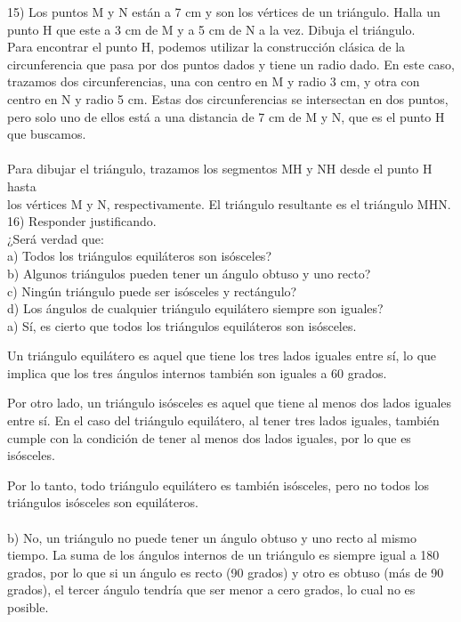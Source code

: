 \documentclass{article}
\begin{document}
15) Los puntos M y N están a 7 cm y son los vértices de un triángulo. Halla un punto H que este a 3 cm de M y a 5 cm de N a la vez. Dibuja el triángulo. \\
Para encontrar el punto H, podemos utilizar la construcción clásica de la circunferencia que pasa por dos puntos dados y tiene un radio dado. En este caso, trazamos dos circunferencias, una con centro en M y radio 3 cm, y otra con centro en N y radio 5 cm. Estas dos circunferencias se intersectan en dos puntos, pero solo uno de ellos está a una distancia de 7 cm de M y N, que es el punto H que buscamos.\\
\\
Para dibujar el triángulo, trazamos los segmentos MH y NH desde el punto H hasta\\
los vértices M y N, respectivamente. El triángulo resultante es el triángulo MHN.\\

16) Responder justificando.\\
¿Será verdad que:\\
a) Todos los triángulos equiláteros son isósceles?\\
b) Algunos triángulos pueden tener un ángulo obtuso y uno recto?\\
c) Ningún triángulo puede ser isósceles y rectángulo?\\
d) Los ángulos de cualquier triángulo equilátero siempre son iguales?\\

a) Sí, es cierto que todos los triángulos equiláteros son isósceles.

Un triángulo equilátero es aquel que tiene los tres lados iguales entre sí, lo que implica que los tres ángulos internos también son iguales a 60 grados.

Por otro lado, un triángulo isósceles es aquel que tiene al menos dos lados iguales entre sí. En el caso del triángulo equilátero, al tener tres lados iguales, también cumple con la condición de tener al menos dos lados iguales, por lo que es isósceles.

Por lo tanto, todo triángulo equilátero es también isósceles, pero no todos los triángulos isósceles son equiláteros.\\
\\
b) No, un triángulo no puede tener un ángulo obtuso y uno recto al mismo tiempo. La suma de los ángulos internos de un triángulo es siempre igual a 180 grados, por lo que si un ángulo es recto (90 grados) y otro es obtuso (más de 90 grados), el tercer ángulo tendría que ser menor a cero grados, lo cual no es posible.
\end{document}
